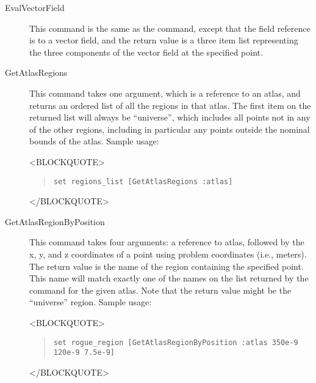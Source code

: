 \begin{description}
\item[EvalVectorField]
This command is the same as the  command, except
that the field reference is to a vector field, and the return value is a
three item list representing the three components of the vector field at
the specified point.

\item[GetAtlasRegions]
This command takes one argument, which is a reference to an atlas, and
returns an ordered list of all the regions in that atlas.  The first
item on the returned list will always be ``universe'', which includes
all points not in any of the other regions, including in particular any
points outside the nominal bounds of the atlas.  Sample usage:
\begin{rawhtml}
<BLOCKQUOTE>
\end{rawhtml}
\begin{quote}
\begin{verbatim}
set regions_list [GetAtlasRegions :atlas]
\end{verbatim}
\end{quote}
\begin{rawhtml}
</BLOCKQUOTE>
\end{rawhtml}


\item[GetAtlasRegionByPosition]
This command takes four arguments: a reference to atlas, followed by the
x, y, and z coordinates of a point using problem coordinates (i.e.,
meters).  The return value is the name of the region containing the
specified point.  This name will match exactly one of the names on the
list returned by the  command for the given atlas.
Note that the return value might be the ``universe'' region.  Sample
usage:
\begin{rawhtml}
<BLOCKQUOTE>
\end{rawhtml}
\begin{quote}
\begin{verbatim}
set rogue_region [GetAtlasRegionByPosition :atlas 350e-9 120e-9 7.5e-9]
\end{verbatim}
\end{quote}
\begin{rawhtml}
</BLOCKQUOTE>
\end{rawhtml}


\end{description}

